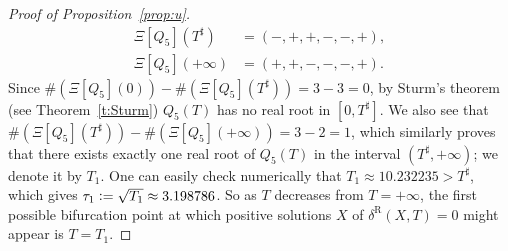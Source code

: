 \begin{proof}[Proof of Proposition~\ref{prop:u}]
\begin{equation}
\begin{split}
\Xi[Q_5](T^\sharp)&=(-,+,+,-,-,+),\\
\Xi[Q_5](+\infty)&=(+,+,-,-,-,+).
\end{split}
\end{equation}
Since $\#(\Xi[Q_5](0))- \#(\Xi[Q_5](T^\sharp))=3-3=0$, by Sturm's theorem (see Theorem~\ref{t:Sturm}) $Q_5(T)$ has no real root in $[0,T^\sharp]$. We also see that $\#(\Xi[Q_5](T^\sharp))- \#(\Xi[Q_5](+\infty))=3-2=1$, which similarly proves that there exists exactly one real root of $Q_5(T)$ in the interval 
$(T^\sharp,+\infty)$; we denote it by $T_1$. One can easily check numerically that $T_1\approx 10.232235>T^\sharp$, which gives $\tau_1\vcentcolon= \sqrt{T_1} \approx 3.198786$.  So as $T$ decreases from $T=+\infty$, the first possible bifurcation point at which positive solutions $X$ of $\delta^\mathrm{R}(X,T)=0$ might appear is $T=T_1$.  


\end{proof}
